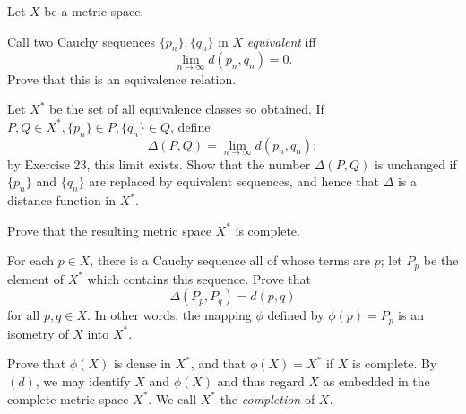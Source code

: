 \documentclass{assignment}
\begin{document}
\begin{question}[3.24*]
  Let $X$ be a metric space.
  \begin{qparts}
  \item Call two Cauchy sequences $\{p_n\}, \{q_n\}$ in $X$ \emph{equivalent} iff $$\lim_{n\to\infty}
    d(p_n, q_n) = 0.$$ Prove that this is an equivalence relation.
  \item Let $X^*$ be the set of all equivalence classes so obtained. If $P, Q\in X^*, \{p_n\}\in P,
    \{q_n\}\in Q$, define $$\Delta(P, Q) = \lim_{n\to\infty} d(p_n, q_n);$$ by Exercise 23, this limit
    exists. Show that the number $\Delta(P,Q)$ is unchanged if $\{p_n\}$ and $\{q_n\}$ are replaced
    by equivalent sequences, and hence that $\Delta$ is a distance function in $X^*$.
  \item Prove that the resulting metric space $X^*$ is complete.
  \item For each $p\in X$, there is a Cauchy sequence all of whose terms are $p$; let $P_p$ be the element
    of $X^*$ which contains this sequence. Prove that $$\Delta(P_p, P_q) = d(p, q)$$ for all $p,q\in X$.
    In other words, the mapping $\phi$ defined by $\phi(p) = P_p$ is an isometry of $X$ into $X^*$.
  \item Prove that $\phi(X)$ is dense in $X^*$, and that $\phi(X) = X^*$ if $X$ is complete. By $(d)$,
    we may identify $X$ and $\phi(X)$ and thus regard $X$ as embedded in the complete metric space $X^*$.
    We call $X^*$ the \emph{completion} of $X$.
\end{qparts}
\end{question}

\newpage
\end{document}
